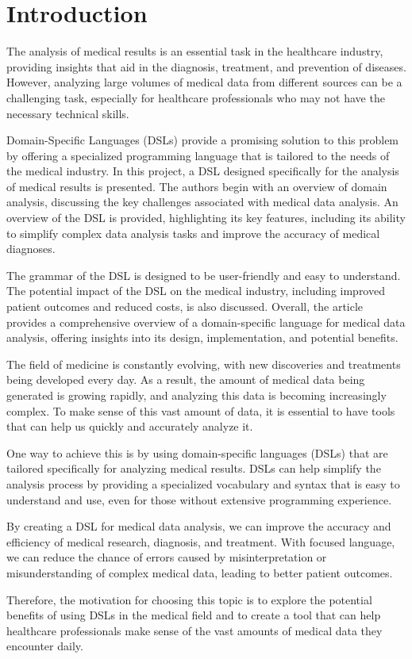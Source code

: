 \chapter*{Introduction}

The analysis of medical results is an essential task in the healthcare industry, providing insights that aid in the diagnosis, treatment, and prevention of diseases. However, analyzing large volumes of medical data from different sources can be a challenging task, especially for healthcare professionals who may not have the necessary technical skills. \par
Domain-Specific Languages (DSLs) provide a promising solution to this problem by offering a specialized programming language that is tailored to the needs of the medical industry. In this project, a DSL designed specifically for the analysis of medical results is presented. The authors begin with an overview of domain analysis, discussing the key challenges associated with medical data analysis. An overview of the DSL is provided, highlighting its key features, including its ability to simplify complex data analysis tasks and improve the accuracy of medical diagnoses. \par
The grammar of the DSL is designed to be user-friendly and easy to understand. The potential impact of the DSL on the medical industry, including improved patient outcomes and reduced costs, is also discussed. Overall, the article provides a comprehensive overview of a domain-specific language for medical data analysis, offering insights into its design, implementation, and potential benefits.

The field of medicine is constantly evolving, with new discoveries and treatments being developed every day. As a result, the amount of medical data being generated is growing rapidly, and analyzing this data is becoming increasingly complex. To make sense of this vast amount of data, it is essential to have tools that can help us quickly and accurately analyze it.

One way to achieve this is by using domain-specific languages (DSLs) that are tailored specifically for analyzing medical results. DSLs can help simplify the analysis process by providing a specialized vocabulary and syntax that is easy to understand and use, even for those without extensive programming experience.

By creating a DSL for medical data analysis, we can improve the accuracy and efficiency of medical research, diagnosis, and treatment. With focused language, we can reduce the chance of errors caused by misinterpretation or misunderstanding of complex medical data, leading to better patient outcomes.

Therefore, the motivation for choosing this topic is to explore the potential benefits of using DSLs in the medical field and to create a tool that can help healthcare professionals make sense of the vast amounts of medical data they encounter daily.
